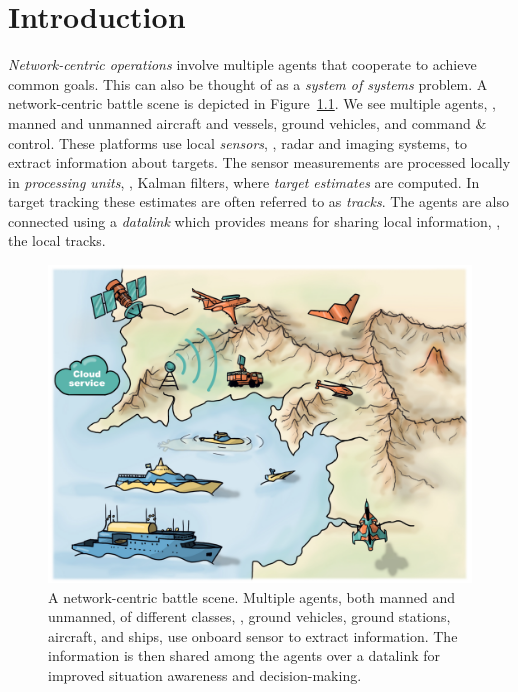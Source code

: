 

\chapter{Introduction} \label{cha:introduction}

\emph{Network-centric operations} involve multiple agents that cooperate to achieve common goals. This can also be thought of as a \emph{system of systems} problem. A network-centric battle scene is depicted in Figure~\ref{fig:intro:network-centric-battle-scene}. We see multiple agents, \eg, manned and unmanned aircraft and vessels, ground vehicles, and command \& control. These platforms use local \emph{sensors}, \eg, radar and imaging systems, to extract information about targets. The sensor measurements are processed locally in \emph{processing units}, \eg, Kalman filters, where \emph{target estimates} are computed. In target tracking these estimates are often referred to as \emph{tracks}. The agents are also connected using a \emph{datalink} which provides means for sharing local information, \eg, the local tracks. 

\begin{figure}[bth]
	\centering
	\includegraphics[width=.9\textwidth]{fig/cha1/network-centric_battle-scene.pdf}
	\caption{A network-centric battle scene. Multiple agents, both manned and unmanned, of different classes, \eg, ground vehicles, ground stations, aircraft, and ships, use onboard sensor to extract information. The information is then shared among the agents over a datalink for improved situation awareness and decision-making. }
	\label{fig:intro:network-centric-battle-scene}
\end{figure}




